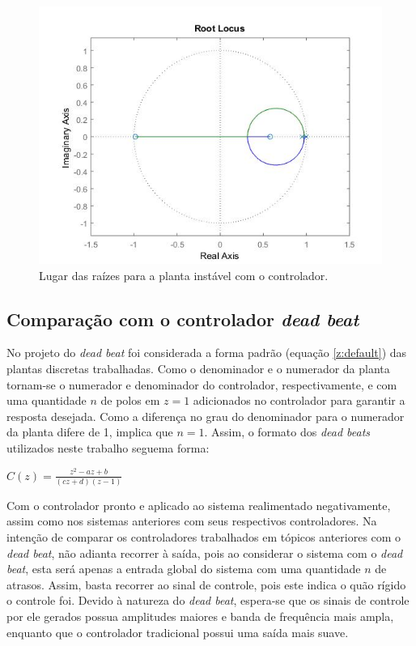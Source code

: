 \begin{figure}[H]
\begin{center}
\includegraphics[width=12cm]{images/RL/RL_ins_C.jpg}
\caption{Lugar das raízes para a planta instável com o controlador.}
\label{rl:ins:c} 
\end{center}
\end{figure}

\subsection{Comparação com o controlador \textit{dead beat}}

No projeto do \textit{dead beat} foi considerada a forma padrão (equação \ref{z:default}) das plantas discretas trabalhadas. Como o denominador e o numerador da planta tornam-se o numerador e denominador do controlador, respectivamente, e com uma quantidade $n$ de polos em $z=1$ adicionados no controlador para garantir a resposta desejada. Como a diferença no grau do denominador para o numerador da planta difere de 1, implica que $n=1$. Assim, o formato dos \textit{dead beats} utilizados neste trabalho seguema forma:

\begin{center}
    $C(z) = \frac{z^2-az+b}{(cz+d)(z-1)}$
\end{center}

Com o controlador pronto e aplicado ao sistema realimentado negativamente, assim como nos sistemas anteriores com seus respectivos controladores. Na intenção de comparar os controladores trabalhados em tópicos anteriores com o \textit{dead beat}, não adianta recorrer à saída, pois ao considerar o sistema com o \textit{dead beat}, esta será apenas a entrada global do sistema com uma quantidade $n$ de atrasos. Assim, basta recorrer ao sinal de controle, pois este indica o quão rígido o controle foi. Devido à natureza do \textit{dead beat}, espera-se que os sinais de controle por ele gerados possua amplitudes maiores e banda de frequência mais ampla, enquanto que o controlador tradicional possui uma saída mais suave.

